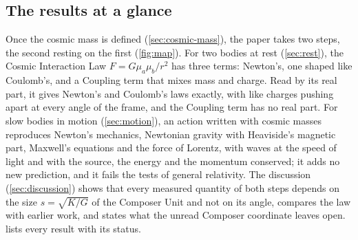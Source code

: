 \documentclass[11pt,a4paper]{article}
\theoremstyle{plain}
\theoremstyle{definition}
\theoremstyle{remark}
\begin{document}
\subsection{The results at a glance}\label{subsec:glance}

Once the cosmic mass is defined (\cref{sec:cosmic-mass}), the paper takes two steps, the second resting on the first (\cref{fig:map}). For two bodies at rest (\cref{sec:rest}), the Cosmic Interaction Law $F = G\mu_a\mu_b/r^2$ has three terms: Newton's, one shaped like Coulomb's, and a Coupling term that mixes mass and charge. Read by its real part, it gives Newton's and Coulomb's laws exactly, with like charges pushing apart at every angle of the frame, and the Coupling term has no real part. For slow bodies in motion (\cref{sec:motion}), an action written with cosmic masses reproduces Newton's mechanics, Newtonian gravity with Heaviside's magnetic part, Maxwell's equations and the force of Lorentz, with waves at the speed of light and with the source, the energy and the momentum conserved; it adds no new prediction, and it fails the tests of general relativity. The discussion (\cref{sec:discussion}) shows that every measured quantity of both steps depends on the size $s = \sqrt{K/G}$ of the Composer Unit and not on its angle, compares the law with earlier work, and states what the unread Composer coordinate leaves open.  lists every result with its status.
\end{document}

